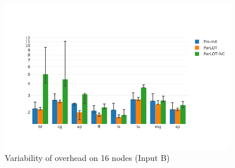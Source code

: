 \begin{figure}[!t]
\centering
\includegraphics[width=4in]{figs.comet.newMed/comet_BX2_Main_16_B_p3_5.png}
\caption{ Variability of \parlotm overhead on 16 nodes (Input B)
}
\label{comet_BX2_Main_16_B_p3_5}
\end{figure}
